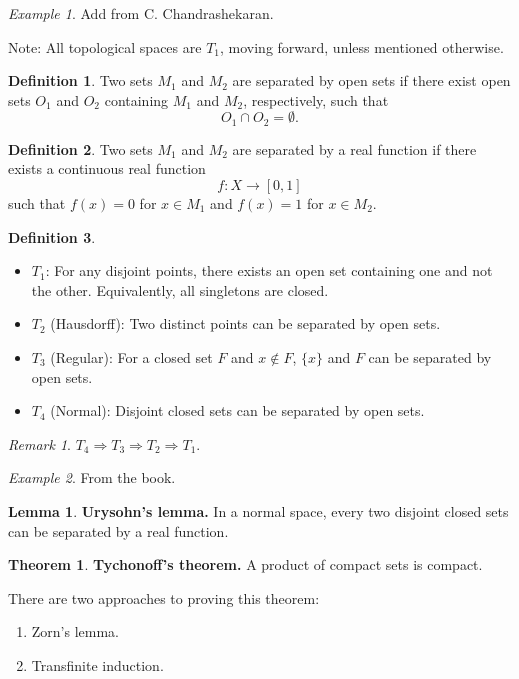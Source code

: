 \documentclass[11pt]{article}
\theoremstyle{definition}
\newtheorem{definition}{Definition}[section]
\newtheorem{theorem}{Theorem}[section]
\newtheorem{lemma}{Lemma}[section]
\theoremstyle{remark}
\newtheorem{remark}{Remark}[section]
\newtheorem{example}{Example}[section]
\begin{document}
\begin{example}\label{ex:homeomorphism_examples}
Add from C. Chandrashekaran.
\end{example}

Note: All topological spaces are $T_1$, moving forward, unless mentioned otherwise.

\begin{definition}\label{def:separated_open_sets}
Two sets $M_1$ and $M_2$ are separated by open sets if there exist open sets $O_1$ and $O_2$ containing $M_1$ and $M_2$, respectively, such that
\[
O_1\cap O_2=\emptyset.
\]
\end{definition}

\begin{definition}\label{def:separated_real_function}
Two sets $M_1$ and $M_2$ are separated by a real function if there exists a continuous real function
\[
f\colon X\rightarrow[0,1]
\]
such that $f(x)=0$ for $x\in M_1$ and $f(x)=1$ for $x\in M_2$.
\end{definition}

\begin{definition}\label{def:separation_axioms}
\begin{itemize}
\item $T_1$: For any disjoint points, there exists an open set containing one and not the other. Equivalently, all singletons are closed.
\item $T_2$ (Hausdorff): Two distinct points can be separated by open sets.
\item $T_3$ (Regular): For a closed set $F$ and $x\notin F$, $\{x\}$ and $F$ can be separated by open sets.
\item $T_4$ (Normal): Disjoint closed sets can be separated
by open sets.
\end{itemize}
\end{definition}

\begin{remark}\label{rem:separation_implications}
$T_4\Rightarrow T_3\Rightarrow T_2\Rightarrow T_1$.
\end{remark}

\begin{example}\label{ex:separation_axioms_from_book}
From the book.
\end{example}

\begin{lemma}\label{lem:urysohn}
\textbf{Urysohn's lemma.} In a normal space, every two disjoint closed sets can be separated by a real function.
\end{lemma}

\begin{theorem}\label{thm:tychonoff}
\textbf{Tychonoff's theorem.} A product of compact sets is compact.

There are two approaches to proving this theorem:
\begin{enumerate}
\item Zorn's lemma.
\item Transfinite induction.
\end{enumerate}
\end{theorem}
\end{document}
